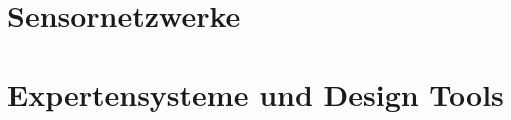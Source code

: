 \documentclass[a4paper,11pt,oneside]{memoir}
\begin{document}


\chapter{Sensornetzwerke}
\label{ch:intro}




\chapter{Expertensysteme und Design Tools}
\label{ch:intro}





%

%


\appendix



\end{document}
